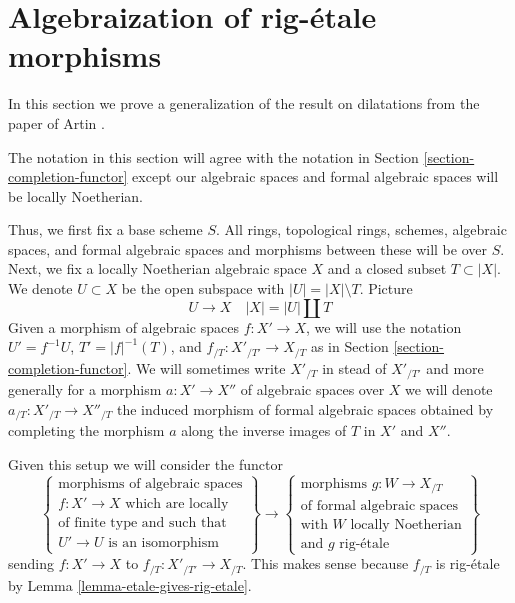 \documentclass{stacks-project}
\theoremstyle{plain}
\theoremstyle{definition}
\theoremstyle{remark}
\numberwithin{equation}{subsection}
\begin{document}
\section{Algebraization of rig-\'etale morphisms}
\label{section-algebraization}

\noindent
In this section we prove a generalization of the result on dilatations
from the paper of Artin \cite{ArtinII}.

\medskip\noindent
The notation in this section will agree with the notation in
Section \ref{section-completion-functor} except our algebraic
spaces and formal algebraic spaces will be locally Noetherian.

\medskip\noindent
Thus, we first fix a base scheme $S$. All rings, topological rings,
schemes, algebraic spaces, and formal algebraic spaces and
morphisms between these will be over $S$. Next, we fix a
locally Noetherian algebraic space $X$ and a closed subset $T \subset |X|$.
We denote $U \subset X$ be the open subspace with $|U| = |X| \setminus T$.
Picture
$$
U \to X \quad |X| = |U| \amalg T
$$
Given a morphism of algebraic spaces $f : X' \to X$, we will use the notation
$U' = f^{-1}U$, $T' = |f|^{-1}(T)$, and $f_{/T} : X'_{/T'} \to X_{/T}$ as in
Section \ref{section-completion-functor}. We will sometimes write
$X'_{/T}$ in stead of $X'_{/T'}$ and more generally for a morphism
$a : X' \to X''$ of algebraic spaces over $X$ we will denote
$a_{/T} : X'_{/T} \to X''_{/T}$ the induced morphism of formal
algebraic spaces obtained by completing the morphism $a$ along
the inverse images of $T$ in $X'$ and $X''$.

\medskip\noindent
Given this setup we will consider the functor
\begin{equation}
\label{equation-completion-functor}
\left\{
\begin{matrix}
\text{morphisms of algebraic spaces}\\
f : X' \to X\text{ which are locally}\\
\text{of finite type and such that}\\
U' \to U\text{ is an isomorphism}
\end{matrix}
\right\}
\longrightarrow
\left\{
\begin{matrix}
\text{morphisms }g : W \to X_{/T}\\
\text{of formal algebraic spaces}\\
\text{with }W\text{ locally Noetherian}\\
\text{and }g\text{ rig-\'etale}
\end{matrix}
\right\}
\end{equation}
sending $f : X' \to X$ to $f_{/T} : X'_{/T'} \to X_{/T}$.
This makes sense because $f_{/T}$ is rig-\'etale by
Lemma \ref{lemma-etale-gives-rig-etale}.
\end{document}

